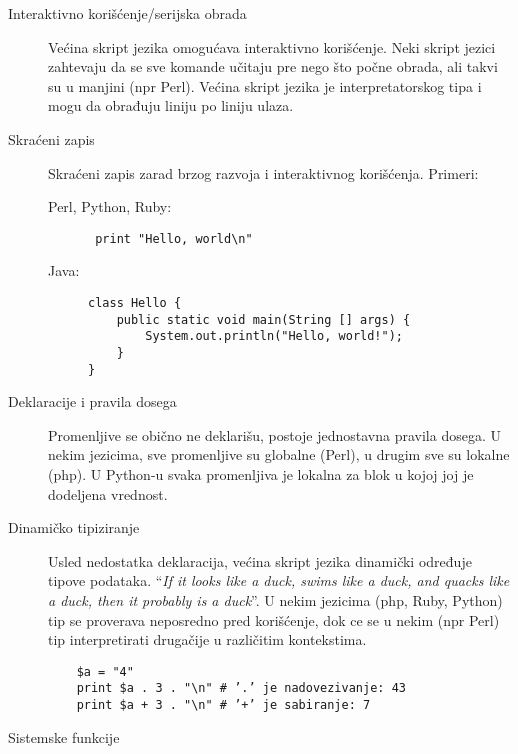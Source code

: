 \documentclass[../main.tex]{subfiles}
\begin{document}
\begin{description}

	\item[Interaktivno korišćenje/serijska obrada] \hfill

	Većina skript jezika omogućava interaktivno korišćenje. Neki skript jezici zahtevaju da se sve komande učitaju pre nego što počne obrada, ali takvi su u manjini (npr Perl). Većina skript jezika je interpretatorskog tipa i mogu da obrađuju liniju po liniju ulaza.
	
	\item[Skraćeni zapis] \hfill

	Skraćeni zapis zarad brzog razvoja i interaktivnog korišćenja. Primeri: 
	\begin{boxprimer}
	\begin{description}
		\item[Perl, Python, Ruby:] \hfill
			
			\begin{verbatim} print "Hello, world\n"\end{verbatim}
	
		\item[Java:] \hfill	
	\begin{Verbatim}
class Hello {
	public static void main(String [] args) {
		System.out.println("Hello, world!"); 
	}
}
	\end{Verbatim}
	\end{description}
	\end{boxprimer}
	\item[Deklaracije i pravila dosega] \hfill
		
		Promenljive se obično ne deklarišu, postoje jednostavna pravila dosega. U nekim jezicima, sve promenljive su globalne (Perl), u drugim sve su lokalne (php). U Python-u svaka promenljiva je lokalna za blok u kojoj joj je dodeljena vrednost.
	
	\item[Dinamičko tipiziranje] \hfill
		
		Usled nedostatka deklaracija, većina skript jezika dinamički određuje tipove podataka. ``{\it If it looks like a duck, swims like a duck, and quacks like a duck, then it probably is a duck}''. U nekim jezicima (php, Ruby, Python) tip se proverava neposredno pred korišćenje, dok ce se u nekim (npr Perl) tip interpretirati drugačije u različitim kontekstima.
	\begin{boxprimer}
	\begin{verbatim}
	$a = "4"
	print $a . 3 . "\n" # ’.’ je nadovezivanje: 43
	print $a + 3 . "\n" # ’+’ je sabiranje: 7
	\end{verbatim}
	\end{boxprimer}
	\item[Sistemske funkcije] \hfill


\end{description}
\end{document}
